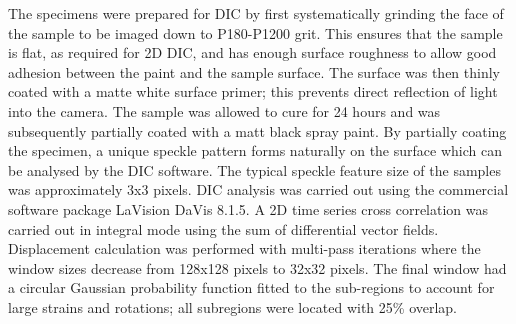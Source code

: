 The specimens were prepared for DIC by first systematically grinding the face of the sample to be imaged down to P180-P1200 grit. This ensures that the sample is flat, as required for 2D DIC, and has enough surface roughness to allow good adhesion between the paint and the sample surface. The surface was then thinly coated with a matte white surface primer; this prevents direct reflection of light into the camera. The sample was allowed to cure for 24 hours and was subsequently partially coated with a matt black spray paint. By partially coating the specimen, a unique speckle pattern forms naturally on the surface which can be analysed by the DIC software. The typical speckle feature size of the samples was approximately 3x3 pixels. DIC analysis was carried out using the commercial software package LaVision DaVis 8.1.5. A 2D time series cross correlation was carried out in integral mode using the sum of differential vector fields. Displacement calculation was performed with multi-pass iterations where the window sizes decrease from 128x128 pixels to 32x32 pixels. The final window had a circular Gaussian probability function fitted to the sub-regions to account for large strains and rotations; all subregions were located with 25\% overlap.

